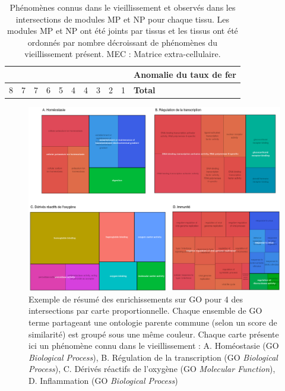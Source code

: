 \begin{table}[]
{\begin{tabular}{@{}lllllllllll@{}}
\cellcolor[HTML]{F8A102} & \cellcolor[HTML]{F8A102}            & \cellcolor[HTML]{F8A102} & \cellcolor[HTML]{F8A102} &                          &                          &                          &                            &                          &                          & Anomalie du taux de fer                   \\
\midrule
8                        & 7                                   & 7                        & 6                        & 5                        & 4                        & 4                        & 3                          & 2                        & 1                        & \textbf{Total}                   
\end{tabular}
}
\caption{Phénomènes connus dans le vieillissement et observés dans les intersections de modules MP et NP pour chaque tissu. Les modules MP et NP ont été joints par tissus et les tissus ont été ordonnés par nombre décroissant de phénomènes du vieillissement présent. MEC : Matrice extra-cellulaire.}
\label{table:intersection_aging_global_phenomenons}
\end{table}


\begin{figure}[ht]
    \centering
    \includegraphics[width=1\textwidth]{img/chap2/chap2_revigo_resume_4_enrich.png}
    \caption{Exemple de résumé des enrichissements sur GO pour 4 des intersections par carte proportionnelle. Chaque ensemble de GO terme partageant une ontologie parente commune (selon un score de similarité) est groupé sous une même couleur. Chaque carte présente ici un phénomène connu dans le vieillissement : A. Homéostasie (GO \textit{Biological Process}), B. Régulation de la transcription (GO \textit{Biological Process}), C. Dérivés réactifs de l'oxygène (GO \textit{Molecular Function}), D. Inflammation (GO \textit{Biological Process}) }
    \label{figure:revigo_resume_4_enrich}
\end{figure}

